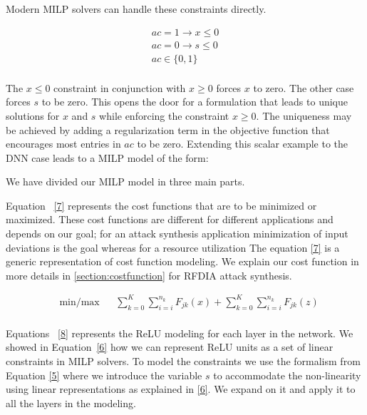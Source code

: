 Modern MILP solvers can handle these constraints directly.

\begin{equation}
\label{6}
\begin{aligned}
ac =  1 \rightarrow x \leq 0  \\
ac =  0 \rightarrow s \leq 0  \\
ac \in \{0,1\} \\
\end{aligned}
\end{equation}

The $x \leq 0$ constraint in conjunction with $x \geq 0$ forces $x$ to zero. The other case forces $s$ to be zero.
This opens the door for a formulation that leads to unique solutions for $x$ and $s$ while enforcing the constraint $x \geq 0$.
The uniqueness may be achieved by adding a regularization term in the objective function that encourages most entries in $ac$ to be zero.
Extending this scalar example to the DNN case leads to a \ac{MILP} model of the form:


We have divided our \ac{MILP} model in three main parts. 


Equation ~\ref{7} represents the cost functions that are to be minimized or maximized.
These cost functions are different for different applications and depends on our goal; for an attack synthesis application minimization of input deviations is the goal whereas for a resource utilization 
The equation \ref{7} is a generic representation of cost function modeling. 
We explain our cost function in more details in \ref{section:costfunction} for \ac{RFDIA} attack synthesis. 

\begin{equation}
\label{7}
\begin{aligned}
& \underset{}{\text{min/max}}
& &  \sum_{k=0}^{K} \sum_{i=i}^{n_k}F_{jk}(x)   + \sum_{k=0}^{K} \sum_{i=i}^{n_k}F_{jk}(z)  \\
\end{aligned}
\end{equation}


Equations ~\ref{8} represents the ReLU modeling for each layer in the network. 
We showed in Equation~\ref{6} how we can represent ReLU units as a set of linear constraints in \ac{MILP} solvers. 
To model the constraints we use the formalism from Equation \ref{5} where we introduce the variable $s$ to accommodate the non-linearity using linear representations as explained in \ref{6}. 
We expand on it and apply it to all the layers in the modeling.   
 
